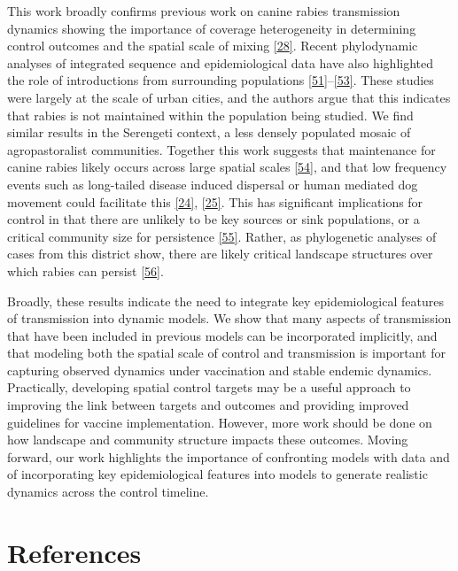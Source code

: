 \documentclass[
  oneside]{book}
\begin{document}
This work broadly confirms previous work on canine rabies transmission dynamics showing the importance of coverage heterogeneity in determining control outcomes and the spatial scale of mixing \protect\hyperlink{ref-Mancyinprep}{{[}28{]}}. Recent phylodynamic analyses of integrated sequence and epidemiological data have also highlighted the role of introductions from surrounding populations \protect\hyperlink{ref-zinsstag2017}{{[}51{]}}--\protect\hyperlink{ref-laager2019}{{[}53{]}}. These studies were largely at the scale of urban cities, and the authors argue that this indicates that rabies is not maintained within the population being studied. We find similar results in the Serengeti context, a less densely populated mosaic of agropastoralist communities. Together this work suggests that maintenance for canine rabies likely occurs across large spatial scales \protect\hyperlink{ref-hampson2007}{{[}54{]}}, and that low frequency events such as long-tailed disease induced dispersal or human mediated dog movement could facilitate this \protect\hyperlink{ref-talbi2010}{{[}24{]}}, \protect\hyperlink{ref-brunker2015}{{[}25{]}}. This has significant implications for control in that there are unlikely to be key sources or sink populations, or a critical community size for persistence \protect\hyperlink{ref-keeling1997}{{[}55{]}}. Rather, as phylogenetic analyses of cases from this district show, there are likely critical landscape structures over which rabies can persist \protect\hyperlink{ref-brunker2018}{{[}56{]}}.

Broadly, these results indicate the need to integrate key epidemiological features of transmission into dynamic models. We show that many aspects of transmission that have been included in previous models can be incorporated implicitly, and that modeling both the spatial scale of control and transmission is important for capturing observed dynamics under vaccination and stable endemic dynamics. Practically, developing spatial control targets may be a useful approach to improving the link between targets and outcomes and providing improved guidelines for vaccine implementation. However, more work should be done on how landscape and community structure impacts these outcomes. Moving forward, our work highlights the importance of confronting models with data and of incorporating key epidemiological features into models to generate realistic dynamics across the control timeline.

\hypertarget{references-4}{%
\section{References}\label{references-4}}
\end{document}
